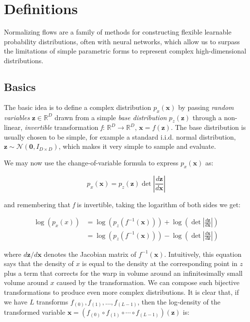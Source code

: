 \section{Definitions}

Normalizing flows are a family of methods for constructing flexible learnable probability distributions, often with neural networks, which allow us to surpass the limitations of simple parametric forms to represent complex high-dimensional distributions.

\subsection{Basics}

The basic idea is to define a complex distribution $p_x(\mathbf{x})$ by passing \emph{random variables} $\mathbf{z} \in \mathbb{R}^D$ drawn from a simple \emph{base distribution} $p_z(\mathbf{z})$ through a non-linear, \emph{invertible} transformation \emph{f}: $\mathbb{R}^D \rightarrow \mathbb{R}^D$, $\mathbf{x} = f(\mathbf{z})$. The base distribution is usually chosen to be simple, for example a standard i.i.d. normal distribution, $\mathbf{z}\sim\mathcal{N}(\mathbf{0},I_{D\times D})$, which makes it very simple to sample and evaluate. 

We may now use the change-of-variable formula to express $p_x(\mathbf{x})$ as:

\[
p_x(\mathbf{x}) = p_z(\mathbf{z})\det\left|\frac{d\mathbf{z}}{d\mathbf{x}}\right|
\]

and remembering that \emph{f} is invertible, taking the logarithm of both sides we get:

\[
	\begin{aligned}
		\log(p_x(x)) &= \log(p_z(f^{-1}(\mathbf{x})))+\log\left(\det\left|\frac{d\mathbf{z}}{d\mathbf{x}}\right|\right)\\
		&= \log(p_z(f^{-1}(\mathbf{x})))-\log\left(\det\left|\frac{d\mathbf{x}}{d\mathbf{z}}\right|\right)
	\end{aligned}
\]

where $d\mathbf{z}/d\mathbf{x}$ denotes the Jacobian matrix of $f^{-1}(\mathbf{x})$.
Intuitively, this equation says that the density of $x$ is equal to the density at the corresponding point in $z$ plus a term that corrects for the warp in volume around an infinitesimally small volume around $x$ caused by the transformation.
	We can compose such bijective transformations to produce even more complex distributions. It is clear that, if we have $L$ transforms $f_{(0)}, f_{(1)},\ldots,f_{(L-1)}$, then the log-density of the transformed variable $\mathbf{x}=(f_{(0)}\circ f_{(1)}\circ\cdots\circ f_{(L-1)})(\mathbf{z})$ is:
	

